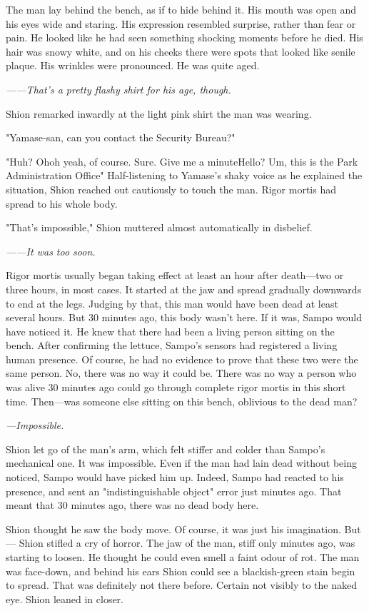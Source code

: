 The man lay behind the bench, as if to hide behind it. His mouth was
open and his eyes wide and staring. His expression resembled surprise,
rather than fear or pain. He looked like he had seen something shocking
moments before he died. His hair was snowy white, and on his cheeks
there were spots that looked like senile plaque. His wrinkles were
pronounced. He was quite aged.

\emph{------That's a pretty flashy shirt for his age, though.}

Shion remarked inwardly at the light pink shirt the man was wearing.

"Yamase-san, can you contact the Security Bureau?"

"Huh? Oh\el oh yeah, of course. Sure. Give me a minute\el Hello? Um,
this is the Park Administration Office\el " Half-listening to Yamase's
shaky voice as he explained the situation, Shion reached out cautiously
to touch the man. Rigor mortis had spread to his whole body.

"That's impossible," Shion muttered almost automatically in disbelief.

\emph{------It was too soon.}

Rigor mortis usually began taking effect at least an hour after
death---two or three hours, in most cases. It started at the jaw and
spread gradually downwards to end at the legs. Judging by that, this man
would have been dead at least several hours. But 30 minutes ago, this
body wasn't here. If it was, Sampo would have noticed it. He knew that
there had been a living person sitting on the bench. After confirming
the lettuce, Sampo's sensors had registered a living human presence. Of
course, he had no evidence to prove that these two were the same person.
No, there was no way it could be. There was no way a person who was
alive 30 minutes ago could go through complete rigor mortis in this
short time. Then---was someone else sitting on this bench, oblivious to
the dead man?

\emph{---Impossible.}

Shion let go of the man's arm, which felt stiffer and colder than
Sampo's mechanical one. It was impossible. Even if the man had lain dead
without being noticed, Sampo would have picked him up. Indeed, Sampo had
reacted to his presence, and sent an "indistinguishable object" error
just minutes ago. That meant that 30 minutes ago, there was no dead body
here.

Shion thought he saw the body move. Of course, it was just his
imagination. But --- Shion stifled a cry of horror. The jaw of the man,
stiff only minutes ago, was starting to loosen. He thought he could even
smell a faint odour of rot. The man was face-down, and behind his ears
Shion could see a blackish-green stain begin to spread. That was
definitely not there before. Certain not visibly to the naked eye. Shion
leaned in closer.

